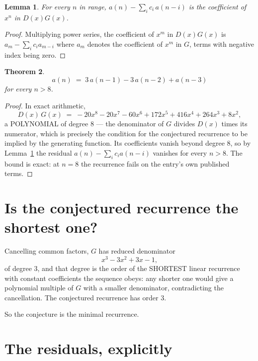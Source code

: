 \documentclass[11pt,a4paper]{article}
\theoremstyle{plain}
\newtheorem{theorem}{Theorem}
\newtheorem{lemma}[theorem]{Lemma}
\theoremstyle{definition}
\begin{document}
\begin{lemma}\label{lem:key}
For every $n$ in range, $a(n)-\sum_i c_i\,a(n-i)$ is the coefficient of $x^{n}$ in
$D(x)G(x)$.
\end{lemma}

\begin{proof}
Multiplying power series, the coefficient of $x^{m}$ in $D(x)G(x)$ is
$a_m-\sum_i c_i a_{m-i}$ where $a_m$ denotes the coefficient of $x^{m}$ in $G$, terms with
negative index being zero.
\end{proof}

\begin{theorem}
\[
a(n)\;=\;3\,a(n-1) - 3\,a(n-2) + a(n-3)
\]
for every $n>8$.
\end{theorem}

\begin{proof}
In exact arithmetic,
\[
D(x)\,G(x)\;=\;- 20 x^{8} - 20 x^{7} - 60 x^{6} + 172 x^{5} + 416 x^{4} + 264 x^{3} + 8 x^{2},
\]
a POLYNOMIAL of degree $8$ --- the denominator of $G$ divides $D(x)$ times its numerator,
which is precisely the condition for the conjectured recurrence to be implied by the
generating function. Its coefficients vanish beyond degree $8$, so by
Lemma~\ref{lem:key} the residual $a(n)-\sum_ic_ia(n-i)$ vanishes for every
$n>8$. The bound is exact: at $n=8$ the recurrence fails on the entry's own published terms.
\end{proof}

\section{Is the conjectured recurrence the shortest one?}

Cancelling common factors, $G$ has reduced denominator
\[
x^{3} - 3 x^{2} + 3 x - 1,
\]
of degree $3$, and that degree is the order of the SHORTEST linear recurrence with
constant coefficients the sequence obeys: any shorter one would give a polynomial multiple of
$G$ with a smaller denominator, contradicting the cancellation. The conjectured recurrence has
order $3$.

So the conjecture is the minimal recurrence.

\section{The residuals, explicitly}
\end{document}
